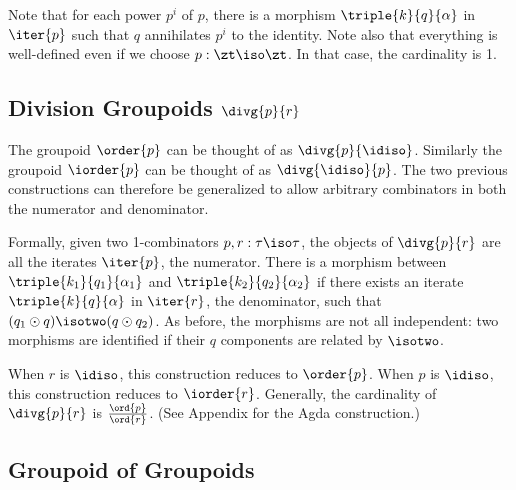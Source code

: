 Note that for each power $p ^ i$ of $p$, there is a morphism
$\triple{k}{q}{\alpha}$ in $\iter{p}$ such that $q$ annihilates $p^i$
to the identity. Note also that everything is well-defined even if we
choose $p : \zt\iso\zt$. In that case, the cardinality is 1.

\subsection{Division Groupoids $\divg{p}{r}$}

The groupoid $\order{p}$ can be thought of as
$\divg{p}{\idiso}$. Similarly the groupoid $\iorder{p}$ can be thought
of as $\divg{\idiso}{p}$. The two previous constructions can therefore
be generalized to allow arbitrary combinators in both the numerator
and denominator.

Formally, given two 1-combinators $p, r : \tau\iso\tau$, the objects
of $\divg{p}{r}$ are all the iterates $\iter{p}$, the numerator. There
is a morphism between $\triple{k_1}{q_1}{\alpha_1}$ and
$\triple{k_2}{q_2}{\alpha_2}$ if there exists an iterate
$\triple{k}{q}{\alpha}$ in $\iter{r}$, the denominator, such that
$(q_1 \odot q) \isotwo (q \odot q_2)$. As before, the morphisms are
not all independent: two morphisms are identified if their $q$
components are related by $\isotwo$.

When $r$ is $\idiso$, this construction reduces to $\order{p}$. When $p$
is $\idiso$, this construction reduces to $\iorder{r}$. Generally, the
cardinality of $\divg{p}{r}$ is $\frac{\ord{p}}{\ord{r}}$. (See Appendix
for the Agda construction.)




\subsection{Groupoid of Groupoids}

